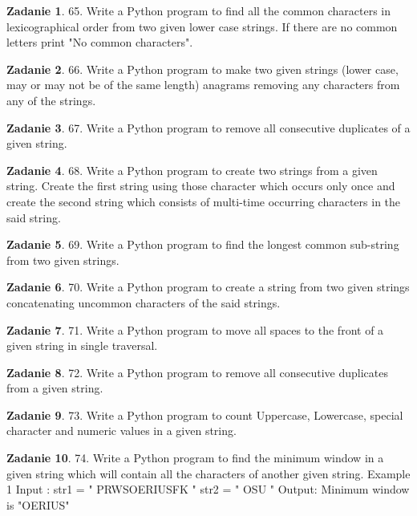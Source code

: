 \documentclass[11pt]{article}
\theoremstyle{definition}
\newtheorem{zadanie}{Zadanie}
\begin{document}
\begin{zadanie}
65. Write a Python program to find all the common characters in lexicographical order from two given lower case strings. If there are no common letters print "No common characters".
\end{zadanie}

\begin{zadanie}
66. Write a Python program to make two given strings (lower case, may or may not be of the same length) anagrams removing any characters from any of the strings.
\end{zadanie}

\begin{zadanie}
67. Write a Python program to remove all consecutive duplicates of a given string.
\end{zadanie}

\begin{zadanie}
68. Write a Python program to create two strings from a given string. Create the first string using those character which occurs only once and create the second string which consists of multi-time occurring characters in the said string.
\end{zadanie}

\begin{zadanie}
69. Write a Python program to find the longest common sub-string from two given strings.
\end{zadanie}

\begin{zadanie}
70. Write a Python program to create a string from two given strings concatenating uncommon characters of the said strings.
\end{zadanie}

\begin{zadanie}
71. Write a Python program to move all spaces to the front of a given string in single traversal.
\end{zadanie}

\begin{zadanie}
72. Write a Python program to remove all consecutive duplicates from a given string.
\end{zadanie}

\begin{zadanie}
73. Write a Python program to count Uppercase, Lowercase, special character and numeric values in a given string.
\end{zadanie}

\begin{zadanie}
74. Write a Python program to find the minimum window in a given string which will contain all the characters of another given string.
Example 1
Input : str1 = " PRWSOERIUSFK "
str2 = " OSU "
Output: Minimum window is "OERIUS"
\end{zadanie}
\end{document}
